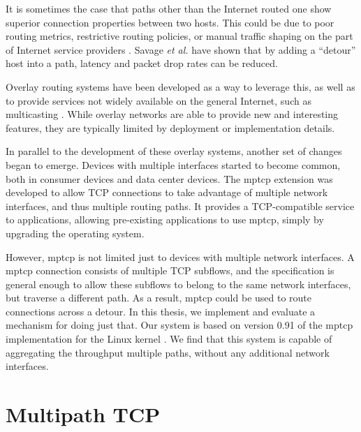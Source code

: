 \documentclass{cwru}
\begin{document}
It is sometimes the case that paths other than the Internet routed one show
superior connection properties between two hosts. This could be due to poor
routing metrics, restrictive routing policies, or manual traffic shaping on the
part of Internet service providers \cite{detour}. Savage \textit{et al.} have
shown that by adding a ``detour'' host into a path, latency and packet drop
rates can be reduced.

Overlay routing systems have been developed as a way to leverage this, as well
as to provide services not widely available on the general Internet, such as
multicasting \cite{ron,mbone,jannotti2000overcast}. While overlay networks are
able to provide new and interesting features, they are typically limited by
deployment or implementation details.

In parallel to the development of these overlay systems, another set of changes
began to emerge. Devices with multiple interfaces started to become common, both
in consumer devices and data center devices. The \ac{mptcp} extension was
developed to allow TCP connections to take advantage of multiple network
interfaces, and thus multiple routing paths. It provides a TCP-compatible
service to applications, allowing pre-existing applications to use \ac{mptcp},
simply by upgrading the operating system.

However, \ac{mptcp} is not limited just to devices with multiple network
interfaces. A \ac{mptcp} connection consists of multiple TCP subflows, and the
specification is general enough to allow these subflows to belong to the same
network interfaces, but traverse a different path. As a result, \ac{mptcp} could
be used to route connections across a detour. In this thesis, we implement and
evaluate a mechanism for doing just that. Our system is based on version 0.91 of
the \ac{mptcp} implementation for the Linux kernel \cite{mptcp}. We find that
this system is capable of aggregating the throughput multiple paths, without any
additional network interfaces.

\section{Multipath TCP}
\end{document}
